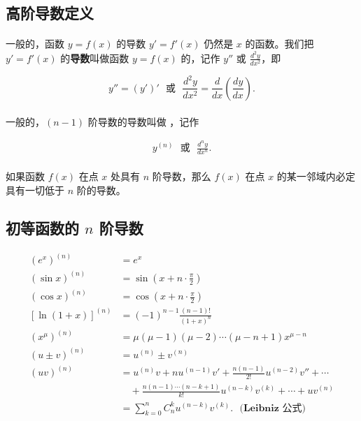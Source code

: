 \subsection{高阶导数定义}
\paragraph{}
一般的，函数 $y = f(x)$ 的导数 $y' = f'(x)$ 仍然是 $x$ 的函数。我们把 $y' = f'(x)$ 的\textbf{导数}叫做函数 $y = f(x)$ 的，记作 $y''$ 或 $\frac{d^2y}{dx^2}$，即

\begin{equation}
y'' = (y')' \text{~~或~~} \frac{d^2y}{dx^2} = \frac{d}{dx}(\frac{dy}{dx}).
\end{equation}

\paragraph{}
一般的，$(n - 1)$ 阶导数的导数叫做 ，记作

\begin{gather}
y^{(n)} \text{~~或~~} \frac{d^ny}{dx^n}.
\end{gather}

\paragraph{}
如果函数 $f(x)$ 在点 $x$ 处具有 $n$ 阶导数，那么 $f(x)$ 在点 $x$ 的某一邻域内必定具有一切低于 $n$ 阶的导数。

\subsection{初等函数的 $n$ 阶导数}

\begin{align}
(e^x)^{(n)} &= e^x \\
(\sin x)^{(n)} &= \sin(x + n \cdot \frac{\pi}{2}) \\
(\cos x)^{(n)} &= \cos(x + n \cdot \frac{\pi}{2}) \\
[\ln(1 + x)]^{(n)} &= (-1)^{n-1}\frac{(n-1)!}{(1+x)^n} \\
(x^{\mu})^{(n)} &= \mu(\mu - 1)(\mu - 2) \cdots (\mu - n + 1)x^{\mu - n} \\
(u \pm v)^{(n)} &= u^{(n)} \pm v^{(n)} \\
(uv)^{(n)} &= u^{(n)}v + nu^{(n - 1)}v' + \frac{n(n-1)}{2!}u^{(n-2)}v'' + \cdots \\
 & \quad + \frac{n(n-1) \cdots (n - k + 1)}{k!} u^{(n - k)}v^{(k)} + \cdots + uv^{(n)} \\
 & = \sum_{k = 0}^{n} C_n^ku^{(n-k)}v^{(k)}. \textbf{~~(Leibniz 公式)}
\end{align}
